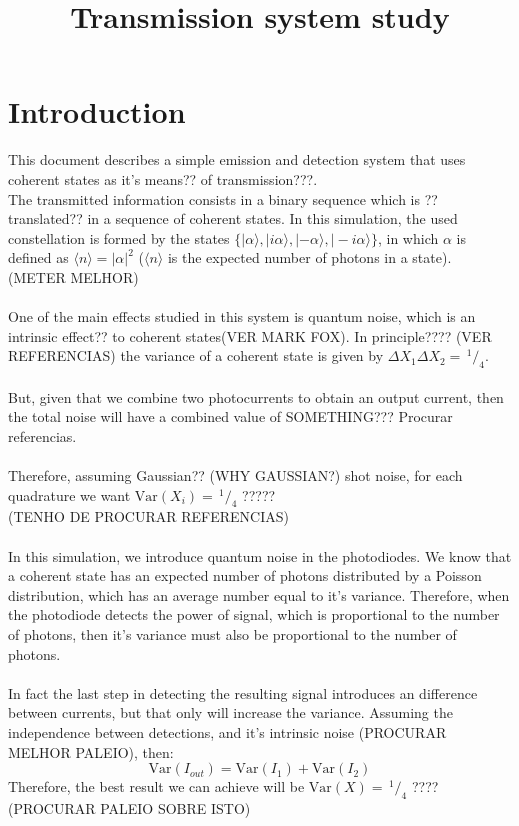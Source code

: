 \documentclass[a4paper]{article}
\title{Transmission system study}
\author{}
\date{}
\newcommand{\ket}[1]{|#1\rangle}
\newcommand{\lrangle}[1]{\langle#1\rangle}
\newcommand{\slantfrac}[2]{\,^{#1}\!/_{#2}}
\begin{document}
\maketitle

\section{Introduction}\label{sec:intro}

This document describes a simple emission and detection system that uses coherent states as it's means?? of transmission???.\\
The transmitted information consists in a binary sequence which is ??translated?? in a sequence of coherent states. In this simulation, the used constellation is formed by the states $\{ \ket{\alpha}, \ket{i\alpha}, \ket{ - \alpha}, \ket{ - i \alpha} \}$, in which $\alpha$ is defined as $\lrangle{n} = |\alpha|^2$ ($\lrangle{n}$ is the expected number of photons in a state). (METER MELHOR) \\
\\
One of the main effects studied in this system is quantum noise, which is an intrinsic effect?? to coherent states(VER MARK FOX). In principle???? (VER REFERENCIAS) the variance of a coherent state is given by $\Delta X_1 \Delta X_2 = \slantfrac{1}{4}$.\\
\\
But, given that we combine two photocurrents to obtain an output current, then the total noise will have a combined value of SOMETHING??? Procurar referencias.\\
\\
Therefore, assuming Gaussian?? (WHY GAUSSIAN?) shot noise, for each quadrature we want $\textrm{Var}(X_i) = \slantfrac{1}{4}$ ?????\\
(TENHO DE PROCURAR REFERENCIAS)
\\
\\
In this simulation, we introduce quantum noise in the photodiodes.
We know that a coherent state has an expected number of photons distributed by a Poisson distribution, which has an average number equal to it's variance. Therefore, when the photodiode detects the power of signal, which is proportional to the number of photons, then it's variance must also be proportional to the number of photons.\\
\\
In fact the last step in detecting the resulting signal introduces an difference between currents, but that only will increase the variance. Assuming the independence between detections, and it's intrinsic noise (PROCURAR MELHOR PALEIO), then:
$$
\textrm{Var}(I_{out}) = \textrm{Var}(I_1) + \textrm{Var}(I_2)
$$
Therefore, the best result we can achieve will be $\textrm{Var}(X) = \slantfrac{1}{4}$ ???? (PROCURAR PALEIO SOBRE ISTO)\\
\\
\\
\end{document}
